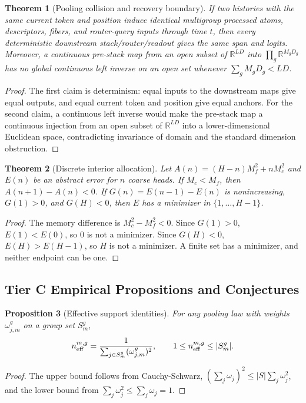 \documentclass{article}
\theoremstyle{plain}
\newtheorem{theorem}{Theorem}[section]
\newtheorem{proposition}[theorem]{Proposition}
\theoremstyle{definition}
\theoremstyle{remark}
\begin{document}
\begin{theorem}[Pooling collision and recovery boundary]
\label{thm:pooling-collision-recovery}
If two histories with the same current token and position induce identical multigroup processed atoms, descriptors, fibers, and router-query inputs through time $t$, then every deterministic downstream stack/router/readout gives the same span and logits.  Moreover, a continuous pre-stack map from an open subset of $\mathbb R^{LD}$ into $\prod_g\mathbb R^{M_gD_g}$ has no global continuous left inverse on an open set whenever $\sum_gM_gD_g<LD$.
\end{theorem}
\begin{proof}
The first claim is determinism: equal inputs to the downstream maps give equal outputs, and equal current token and position give equal anchors.  For the second claim, a continuous left inverse would make the pre-stack map a continuous injection from an open subset of $\mathbb R^{LD}$ into a lower-dimensional Euclidean space, contradicting invariance of domain and the standard dimension obstruction.
\end{proof}

\begin{theorem}[Discrete interior allocation]
\label{thm:conditional-interior-allocation}
Let $A(n)=(H-n)M_f^2+nM_c^2$ and $E(n)$ be an abstract error for $n$ coarse heads.  If $M_c<M_f$, then $A(n+1)-A(n)<0$.  If $G(n)=E(n-1)-E(n)$ is nonincreasing, $G(1)>0$, and $G(H)<0$, then $E$ has a minimizer in $\{1,\ldots,H-1\}$.
\end{theorem}
\begin{proof}
The memory difference is $M_c^2-M_f^2<0$.  Since $G(1)>0$, $E(1)<E(0)$, so $0$ is not a minimizer.  Since $G(H)<0$, $E(H)>E(H-1)$, so $H$ is not a minimizer.  A finite set has a minimizer, and neither endpoint can be one.
\end{proof}

\subsection{Tier C Empirical Propositions and Conjectures}
\label{sec:mrp6-tier-c}

\begin{proposition}[Effective support identities]
\label{prop:effective-support-bounds}
For any pooling law with weights $\omega_{j,m}^g$ on a group set $S_m^g$,
\begin{equation}
n_{\rm eff}^{m,g}=\frac{1}{\sum_{j\in S_m^g}(\omega_{j,m}^g)^2},
\qquad
1\le n_{\rm eff}^{m,g}\le |S_m^g|.
\end{equation}
\end{proposition}
\begin{proof}
The upper bound follows from Cauchy-Schwarz, $(\sum_j\omega_j)^2\le |S|\sum_j\omega_j^2$, and the lower bound from $\sum_j\omega_j^2\le\sum_j\omega_j=1$.
\end{proof}
\end{document}
